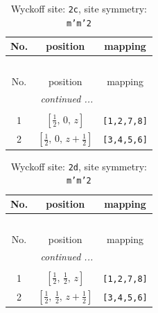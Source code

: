 \documentclass[fleqn,8pt]{jsarticle}
\begin{document}
\begin{longtable}{ccc}
\caption{Wyckoff site: {\tt 2c}, site symmetry: {\tt m'm'2}}
 \\
 \hline \hline
No. & position & mapping \\ \hline \endfirsthead

\multicolumn{2}{l}{\tablename\ \thetable{}} \\
 \hline \hline
No. & position & mapping \\ \hline \endhead

 \hline \hline
\multicolumn{2}{r}{\footnotesize\it continued ...} \\ \endfoot

 \hline \hline
\multicolumn{2}{r}{} \\ \endlastfoot

1 & $\left[ \frac{1}{2},\, 0,\, z \right]$ & {\tt [1,2,7,8]} \\ \hline
2 & $\left[ \frac{1}{2},\, 0,\, z + \frac{1}{2} \right]$ & {\tt [3,4,5,6]} \\
\end{longtable}
\renewcommand{\arraystretch}{1.2}
\begin{longtable}{ccc}
\caption{Wyckoff site: {\tt 2d}, site symmetry: {\tt m'm'2}}
 \\
 \hline \hline
No. & position & mapping \\ \hline \endfirsthead

\multicolumn{2}{l}{\tablename\ \thetable{}} \\
 \hline \hline
No. & position & mapping \\ \hline \endhead

 \hline \hline
\multicolumn{2}{r}{\footnotesize\it continued ...} \\ \endfoot

 \hline \hline
\multicolumn{2}{r}{} \\ \endlastfoot

1 & $\left[ \frac{1}{2},\, \frac{1}{2},\, z \right]$ & {\tt [1,2,7,8]} \\ \hline
2 & $\left[ \frac{1}{2},\, \frac{1}{2},\, z + \frac{1}{2} \right]$ & {\tt [3,4,5,6]} \\
\end{longtable}
\renewcommand{\arraystretch}{1.2}
\end{document}
